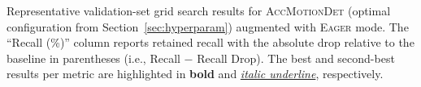 \begin{table}[hbtp]
    \caption{Representative validation-set grid search results for \textsc{AccMotionDet}
    (optimal configuration from Section~\ref{sec:hyperparam}) augmented
    with \textsc{Eager} mode. The ``Recall (\%)'' column reports retained recall
    with the absolute drop relative to the baseline in parentheses (i.e.,
    Recall $-$ Recall Drop). The best and second-best results per metric are
    highlighted in \textbf{bold} and \textit{\underline{italic underline}},
    respectively.
}
    \label{tb:gridsearch_accMotionDetEager}
\end{table}

